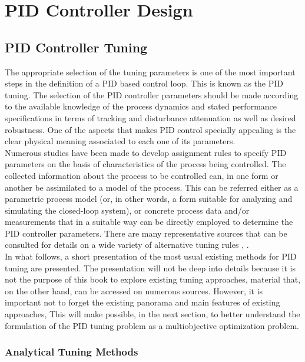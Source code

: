 \chapter{PID Controller Design}

\section{PID Controller Tuning}
The appropriate selection of the tuning parameters is one of the most important steps in the definition of a PID based control loop. This is known as the PID tuning. The selection of the PID controller parameters should be made according to the available knowledge of the process dynamics and stated performance specifications in terms of tracking and disturbance attenuation as well as desired robustness. One of the aspects that makes PID control specially appealing is the clear physical meaning associated to each one of its parameters. \\

Numerous studies have been made to develop assignment rules to specify PID parameters on the basis of characteristics of the process being controlled. The collected information about the process to be controlled can, in one form or another be assimilated to a model of the process. This can be referred either as a parametric process model (or, in other words, a form suitable for analyzing and simulating the closed-loop system), or concrete process data and/or measurements that in a suitable way can be directly employed to determine the PID controller parameters. There are many representative sources that can be consulted for details on a wide variety of alternative tuning rules  \cite{odwyer2006}, \cite{vilanova2012}. \\

In what follows, a short presentation of the most usual existing methods for PID tuning are presented. The presentation will not be deep into details because it is not the purpose of this book to explore existing tuning approaches, material that, on the other hand, can be accessed on numerous sources.  However, it is important not to forget the existing panorama and main features of existing approaches, This will make possible, in the next section, to better understand the formulation of the PID tuning problem as a multiobjective optimization problem.

\subsection{Analytical Tuning Methods}

